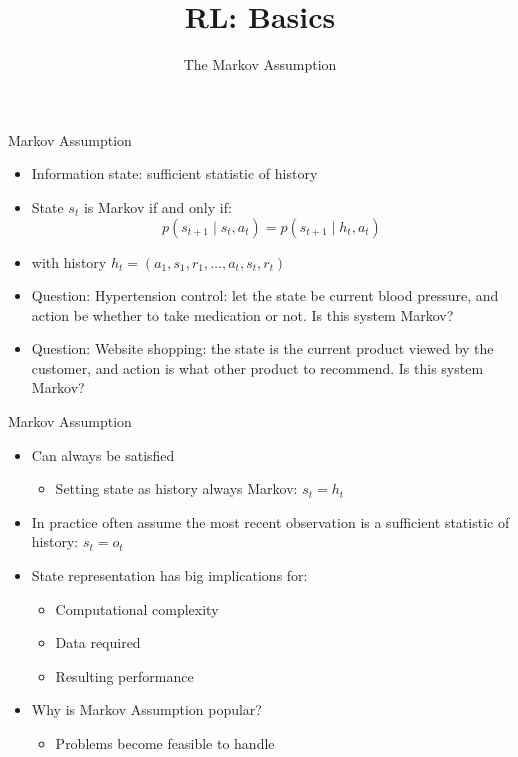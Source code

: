 \documentclass[aspectratio=169]{../latex_main/tntbeamer}  %
\title[Reinforcement Learning: Basics]{RL: Basics}
\subtitle{The Markov Assumption}
\begin{document}
	
	\maketitle

\begin{frame}[c]{Markov Assumption}

\begin{itemize}
	\item Information state: sufficient statistic of history
	\item State $s_t$ is Markov if and only if:
	$$ p(s_{t+1} \mid s_t, a_t) = p(s_{t+1} \mid h_t, a_t)$$
	\item with history $h_t = (a_1, s_1, r_1, \ldots, a_t, s_t, r_t)$
	\pause
	\medskip
	\item \alert{Question:} Hypertension control: let the state be current blood pressure, and action be whether to take medication or not. Is this system Markov?
	\item \alert{Question:} Website shopping: the state is the current product viewed by the customer, and action is what other product to recommend. Is this system Markov?
\end{itemize}

\end{frame}
\begin{frame}[c]{Markov Assumption}
	
	\begin{itemize}
		\item Can always be satisfied
		\begin{itemize}
			\item Setting state as history always Markov: $s_t = h_t$
		\end{itemize}
		\item In practice often assume the most recent observation is a sufficient statistic
		of history: $s_t = o_t$
		\item State representation has big implications for:
		\begin{itemize}
			\item Computational complexity
			\item Data required
			\item Resulting performance
		\end{itemize}
        \item Why is Markov Assumption popular?
        \begin{itemize}
            \item Problems become feasible to handle
        \end{itemize}
	\end{itemize}
	
\end{frame}
\end{document}
